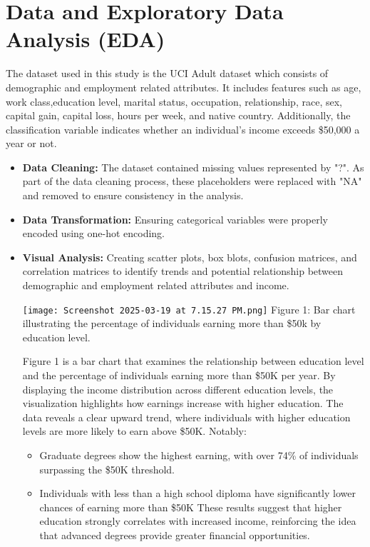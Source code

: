 \documentclass{article}
\begin{document}
\section{Data and Exploratory Data Analysis (EDA)}
The dataset used in this study is the UCI Adult dataset which consists of demographic and employment related attributes. It includes features such as age, work class,education level, marital status, occupation, relationship, race, sex, capital gain, capital loss, hours per week, and native country. Additionally, the classification variable indicates whether an individual's income exceeds \$50,000 a year or not.
\begin{itemize}
    \item \textbf{Data Cleaning:} The dataset contained missing values represented by "?". As part of the data cleaning process, these placeholders were replaced with "NA" and removed to ensure consistency in the analysis.   
    \item \textbf{Data Transformation:} Ensuring categorical variables were properly encoded using one-hot encoding.
    
    \item \textbf{Visual Analysis:} Creating scatter plots, box blots, confusion matrices, and correlation matrices to identify trends and potential relationship between demographic and employment related attributes and income. 
    
    \texttt{[image: Screenshot 2025-03-19 at 7.15.27 PM.png]} Figure 1: Bar chart illustrating the percentage of individuals earning more than \$50k by education level.
    
    Figure 1 is a bar chart that examines the relationship between education level and the percentage of individuals earning more than \$50K per year. By displaying the income distribution across different education levels, the visualization highlights how earnings increase with higher education. The data reveals a clear upward trend, where individuals with higher education levels are more likely to earn above \$50K. Notably:
    \begin{itemize}
        \item Graduate degrees show the highest earning, with over 74\% of individuals surpassing the \$50K threshold.
        \item Individuals with less than a high school diploma have significantly lower chances of earning more than \$50K
        These results suggest that higher education strongly correlates with increased income, reinforcing the idea that advanced degrees provide greater financial opportunities.
    \end{itemize}
\end{itemize}
\end{document}
